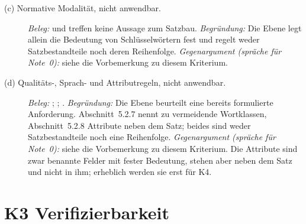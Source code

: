 \documentclass[11pt,a4paper]{report}
\begin{document}
\begin{description}
  \item[(c) Normative Modalität, nicht anwendbar.]
  \emph{Beleg:} \cite[Abschn.~1--5]{rfc2119} und
  \cite[Abschn.~2]{rfc8174} treffen keine Aussage zum Satzbau.
  \emph{Begründung:} Die Ebene legt allein die Bedeutung von
  Schlüsselwörtern fest und regelt weder Satzbestandteile noch deren
  Reihenfolge.
  \emph{Gegenargument (spräche für Note~0):} siehe die Vorbemerkung zu
  diesem Kriterium.

  \item[(d) Qualitäts-, Sprach- und Attributregeln, nicht anwendbar.]
  \emph{Beleg:} \cite[Abschn.~5.2.7, 5.2.8.1 und 5.2.8.2]{iso29148};
  \cite[Tab.~1]{lucassen2016qus};
  \cite[Abschn.~Testing the Hypothesis]{mavin2010bigears}.
  \emph{Begründung:} Die Ebene beurteilt eine bereits formulierte
  Anforderung. Abschnitt~5.2.7 nennt zu vermeidende Wortklassen,
  Abschnitt~5.2.8 Attribute neben dem Satz; beides sind weder
  Satzbestandteile noch eine Reihenfolge.
  \emph{Gegenargument (spräche für Note~0):} siehe die Vorbemerkung zu
  diesem Kriterium. Die Attribute sind zwar benannte Felder mit fester
  Bedeutung, stehen aber neben dem Satz und nicht in ihm; erheblich
  werden sie erst für K4.
\end{description}


\section{K3 Verifizierbarkeit}
\label{sec:anhang-k3}
\end{document}
